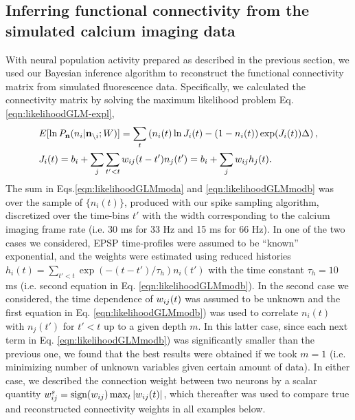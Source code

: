 \subsection{Inferring functional connectivity from the simulated calcium imaging data} \label{sec:results:inference}

%

With neural population activity prepared as described in the previous section,
we used our Bayesian inference algorithm to reconstruct the functional connectivity matrix from simulated fluorescence data.
Specifically, we calculated the connectivity matrix by solving the maximum likelihood problem Eq. \ref{eqn:likelihoodGLM-expl},
\begin{align}
\label{eqn:likelihoodGLMmoda}&E[\ln P_{\bn}(n_i|{\bf n}_{\i}; W)]=\sum_t \left( n_i(t) \ln J_i(t) - (1-n_i(t)) \exp(J_i(t)) \Delta \right), \\
\label{eqn:likelihoodGLMmodb}&J_i(t)=b_i+\sum\limits_j \sum\limits_{t'<t} \w_{ij}(t-t')n_{j}(t')=
b_i+\sum\limits_j w_{ij} h_j(t).
\end{align}
The sum in Eqs.\ref{eqn:likelihoodGLMmoda} and \ref{eqn:likelihoodGLMmodb} was over the sample of $\{n_i(t)\}$, produced with our spike sampling algorithm, discretized over the time-bins $t'$ with the width corresponding to the calcium imaging frame rate (i.e. 30 ms for 33 Hz and 15 ms for 66 Hz). In one of the two cases we considered, EPSP time-profiles were assumed to be ``known'' exponential, and the weights were estimated using reduced histories $h_{i}(t)=\sum_{t'<t} \exp(-(t-t')/\tau_h)n_{i}(t')$ with the time constant $\tau_h=10$ ms (i.e. second equation in Eq. \ref{eqn:likelihoodGLMmodb}). In the second case we considered, the time dependence of $w_{ij}(t)$ was assumed to be unknown and the first equation in Eq. \ref{eqn:likelihoodGLMmodb}) was used to correlate $n_i(t)$ with $n_j(t')$ for $t'<t$ up to a given depth $m$.  In this latter case, since each next term in Eq. \ref{eqn:likelihoodGLMmodb}) was significantly smaller than the previous one, we found that the best results were obtained if we took $m=1$ (i.e. minimizing number of unknown variables given certain amount of data).
In either case, we described the connection weight between two neurons by a scalar quantity $w_{ij}^s=\text{sign}(w_{ij})\max_{t} |w_{ij}(t)|$, which thereafter was used to compare true and reconstructed connectivity weights in all examples below.

